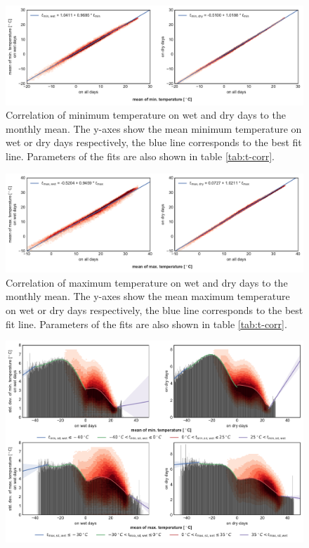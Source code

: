 \begin{refsection}
\begin{figure}
	\includegraphics[width=12cm]{gwgen-figures/f05.pdf}
	\caption[Correlation of minimum temperature on wet and dry days to the monthly mean]{Correlation of minimum temperature on wet and dry days to the monthly mean. The y-axes show the mean minimum temperature on wet or dry days respectively, the blue line corresponds to the best fit line. Parameters of the fits are also shown in table \ref{tab:t-corr}.}
	\label{fig:tmin}
\end{figure}
\begin{figure}
	\includegraphics[width=12cm]{gwgen-figures/f06.pdf}
	\caption[Correlation of maximum temperature on wet and dry days to the monthly mean]{Correlation of maximum temperature on wet and dry days to the monthly mean. The y-axes show the mean maximum temperature on wet or dry days respectively, the blue line corresponds to the best fit line. Parameters of the fits are also shown in table \ref{tab:t-corr}.}
	\label{fig:tmax}
\end{figure}
\begin{figure}
	\includegraphics[width=12cm]{gwgen-figures/f07.pdf}

\end{figure}
\end{refsection}
